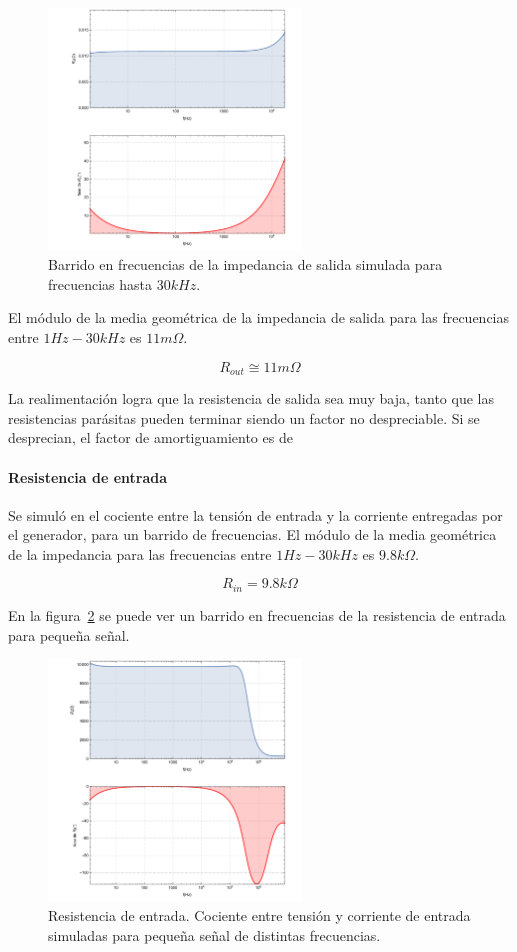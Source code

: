\documentclass[a4paper,12pt,twoside]{article}
\begin{document}
\begin{figure}[H]
	\centering
	\includegraphics[width=0.6\textwidth]{img/sim/R_out-zoom}
	\caption{Barrido en frecuencias de la impedancia de salida simulada para frecuencias hasta $30kHz$.}
	\label{fig:R_out-zoom}
\end{figure}

El módulo de la media geométrica de la impedancia de salida para las frecuencias entre $1Hz-30kHz$ es $11m\Omega$.

\[R_{out}\cong 11m\Omega\]

La realimentación logra que la resistencia de salida sea muy baja, tanto que las resistencias parásitas pueden terminar siendo un factor no despreciable. Si se desprecian, el factor de amortiguamiento es de


\paragraph{Resistencia de entrada}

Se simuló en el cociente entre la tensión de entrada y la corriente entregadas por el generador, para un barrido de frecuencias. El módulo de la media geométrica de la impedancia para las frecuencias entre $1Hz-30kHz$ es $9.8k\Omega$.

\[R_{in}=9.8k\Omega\]

En la figura~\ref{fig:R_i} se puede ver un barrido en frecuencias de la resistencia de entrada para pequeña señal.


\begin{figure}[H]
	\centering
	\includegraphics[width=0.6\textwidth]{img/sim/R_i}
	\caption{Resistencia de entrada. Cociente entre tensión y corriente de entrada simuladas para pequeña señal de distintas frecuencias.}
	\label{fig:R_i}
\end{figure}
\end{document}
